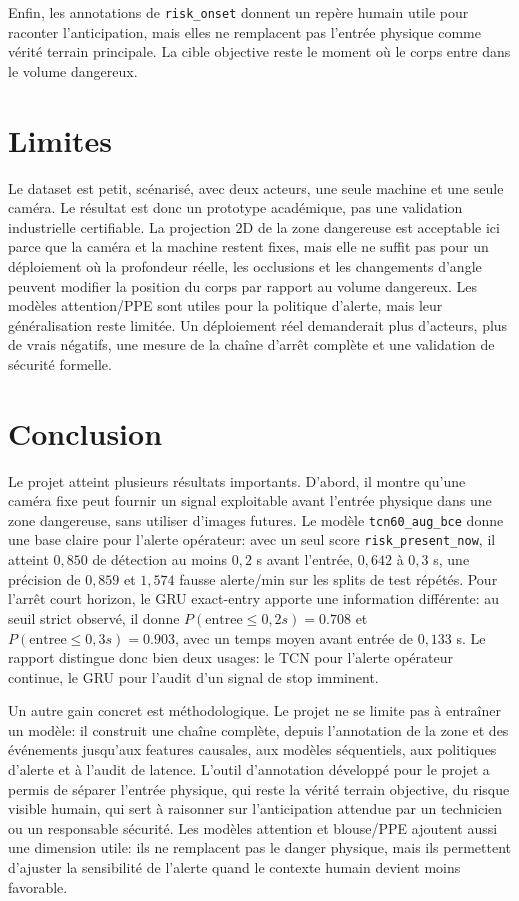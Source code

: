 \documentclass[11pt]{article}
\begin{document}
Enfin, les annotations de \texttt{risk\_onset} donnent un repère humain utile pour raconter l'anticipation, mais elles ne remplacent pas l'entrée physique comme vérité terrain principale. La cible objective reste le moment où le corps entre dans le volume dangereux.

\section{Limites}
Le dataset est petit, scénarisé, avec deux acteurs, une seule machine et une seule caméra. Le résultat est donc un prototype académique, pas une validation industrielle certifiable. La projection 2D de la zone dangereuse est acceptable ici parce que la caméra et la machine restent fixes, mais elle ne suffit pas pour un déploiement où la profondeur réelle, les occlusions et les changements d'angle peuvent modifier la position du corps par rapport au volume dangereux. Les modèles attention/PPE sont utiles pour la politique d'alerte, mais leur généralisation reste limitée. Un déploiement réel demanderait plus d'acteurs, plus de vrais négatifs, une mesure de la chaîne d'arrêt complète et une validation de sécurité formelle.

\section{Conclusion}
Le projet atteint plusieurs résultats importants. D'abord, il montre qu'une caméra fixe peut fournir un signal exploitable avant l'entrée physique dans une zone dangereuse, sans utiliser d'images futures. Le modèle \texttt{tcn60\_aug\_bce} donne une base claire pour l'alerte opérateur: avec un seul score \texttt{risk\_present\_now}, il atteint $0,850$ de détection au moins $0,2$ s avant l'entrée, $0,642$ à $0,3$ s, une précision de $0,859$ et $1,574$ fausse alerte/min sur les splits de test répétés. Pour l'arrêt court horizon, le GRU exact-entry apporte une information différente: au seuil strict observé, il donne $P(\mathrm{entree}\le0,2s)=0.708$ et $P(\mathrm{entree}\le0,3s)=0.903$, avec un temps moyen avant entrée de $0,133$ s. Le rapport distingue donc bien deux usages: le TCN pour l'alerte opérateur continue, le GRU pour l'audit d'un signal de stop imminent.

Un autre gain concret est méthodologique. Le projet ne se limite pas à entraîner un modèle: il construit une chaîne complète, depuis l'annotation de la zone et des événements jusqu'aux features causales, aux modèles séquentiels, aux politiques d'alerte et à l'audit de latence. L'outil d'annotation développé pour le projet a permis de séparer l'entrée physique, qui reste la vérité terrain objective, du risque visible humain, qui sert à raisonner sur l'anticipation attendue par un technicien ou un responsable sécurité. Les modèles attention et blouse/PPE ajoutent aussi une dimension utile: ils ne remplacent pas le danger physique, mais ils permettent d'ajuster la sensibilité de l'alerte quand le contexte humain devient moins favorable.
\end{document}
